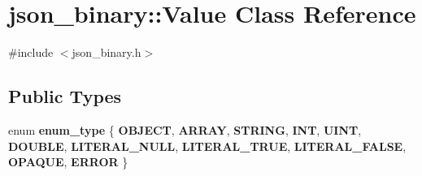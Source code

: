 \hypertarget{classjson__binary_1_1Value}{}\section{json\+\_\+binary\+:\+:Value Class Reference}
\label{classjson__binary_1_1Value}


{\ttfamily \#include $<$json\+\_\+binary.\+h$>$}

\subsection*{Public Types}
\begin{DoxyCompactItemize}
\item 
\mbox{\label{classjson__binary_1_1Value_a4c69f1edaae6d8e6578e9127e1603385}} 
enum {\bfseries enum\+\_\+type} \{ \newline
{\bfseries O\+B\+J\+E\+CT}, 
{\bfseries A\+R\+R\+AY}, 
{\bfseries S\+T\+R\+I\+NG}, 
{\bfseries I\+NT}, 
\newline
{\bfseries U\+I\+NT}, 
{\bfseries D\+O\+U\+B\+LE}, 
{\bfseries L\+I\+T\+E\+R\+A\+L\+\_\+\+N\+U\+LL}, 
{\bfseries L\+I\+T\+E\+R\+A\+L\+\_\+\+T\+R\+UE}, 
\newline
{\bfseries L\+I\+T\+E\+R\+A\+L\+\_\+\+F\+A\+L\+SE}, 
{\bfseries O\+P\+A\+Q\+UE}, 
{\bfseries E\+R\+R\+OR}
 \}
\end{DoxyCompactItemize}
